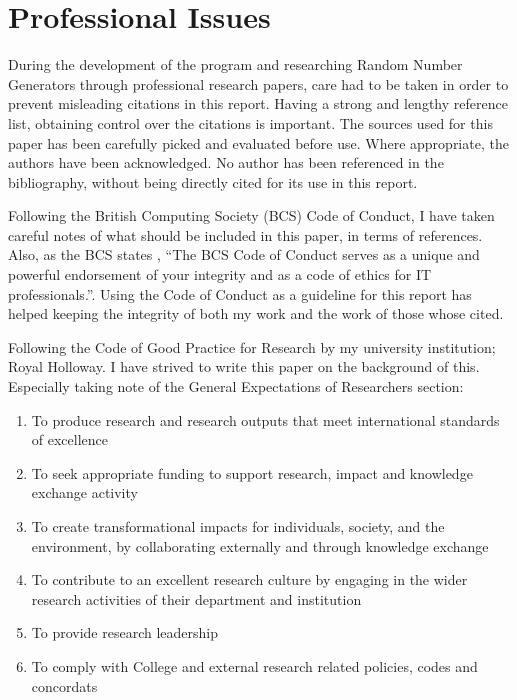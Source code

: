 \documentclass[]{final_report}
\begin{document}
\chapter*{Professional Issues}
\par{During the development of the program and researching Random Number Generators through professional research papers, care had to be taken in order to prevent misleading citations in this report. Having a strong and lengthy reference list, obtaining control over the citations is important. The sources used for this paper has been carefully picked and evaluated before use. Where appropriate, the authors have been acknowledged. No author has been referenced in the bibliography, without being directly cited for its use in this report.}

\par{Following the British Computing Society (BCS) Code of Conduct, I have taken careful notes of what should be included in this paper, in terms of references. Also, as the BCS states \cite{BCS:2020}, ``The BCS Code of Conduct serves as a unique and powerful endorsement of your integrity and as a code of ethics for IT professionals.''. Using the Code of Conduct as a guideline for this report has helped keeping the integrity of both my work and the work of those whose cited.}

\par{Following the Code of Good Practice for Research \cite{RHCGPR:2020} by my university institution; Royal Holloway. I have strived to write this paper on the background of this. Especially taking note of the General Expectations of Researchers section:}

\begin{enumerate}
\item{To produce research and research outputs that meet international standards of excellence}
\item{To seek appropriate funding to support research, impact and knowledge exchange activity}
\item{To create transformational impacts for individuals, society, and the environment, by collaborating
externally and through knowledge exchange}
\item{To contribute to an excellent research culture by engaging in the wider research activities of their
department and institution}
\item{To provide research leadership}
\item{To comply with College and external research related policies, codes and concordats}
\end{enumerate}
\end{document}
